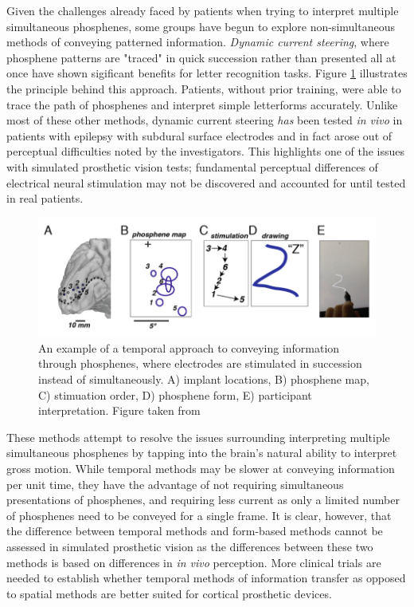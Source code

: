 \documentclass[a4paper,11pt,openany]{book}
\begin{document}
Given the challenges already faced by patients when trying to interpret multiple simultaneous phosphenes, some groups have begun to explore non-simultaneous methods of conveying patterned information.
\emph{Dynamic current steering}, where phosphene patterns are "traced" in quick succession rather than presented all at once have shown sigificant benefits for letter recognition tasks. \cite{beauchamp_dynamic_2018,spencer_creating_2018}
Figure \ref{fig:org2d2ba8d} illustrates the principle behind this approach.
Patients, without prior training, were able to trace the path of phosphenes and interpret simple letterforms accurately.
Unlike most of these other methods, dynamic current steering \emph{has} been tested \emph{in vivo} in patients with epilepsy with subdural surface electrodes and in fact arose out of perceptual difficulties noted by the investigators. \cite{beauchamp_dynamic_2018}
This highlights one of the issues with simulated prosthetic vision tests; fundamental perceptual differences of electrical neural stimulation may not be discovered and accounted for until tested in real patients.

\begin{figure}[htbp]
\centering
\includegraphics[width=.9\linewidth]{./graphics/litreview/temporal.png}
\caption[Example of conveying information temporally through phosphenes]{\label{fig:org2d2ba8d}
An example of a temporal approach to conveying information through phosphenes, where electrodes are stimulated in succession instead of simultaneously. A) implant locations, B) phosphene map, C) stimuation order, D) phosphene form, E) participant interpretation. Figure taken from \cite{beauchamp_dynamic_2018}}
\end{figure}

These methods attempt to resolve the issues surrounding interpreting multiple simultaneous phosphenes by tapping into the brain's natural ability to interpret gross motion. \cite{grossman_brain_2002}
While temporal methods may be slower at conveying information per unit time, they have the advantage of not requiring simultaneous presentations of phosphenes, and requiring less current as only a limited number of phosphenes need to be conveyed for a single frame.
It is clear, however, that the difference between temporal methods and form-based methods cannot be assessed in simulated prosthetic vision as the differences between these two methods is based on differences in \emph{in vivo} perception.
More clinical trials are needed to establish whether temporal methods of information transfer as opposed to spatial methods are better suited for cortical prosthetic devices.
\end{document}
